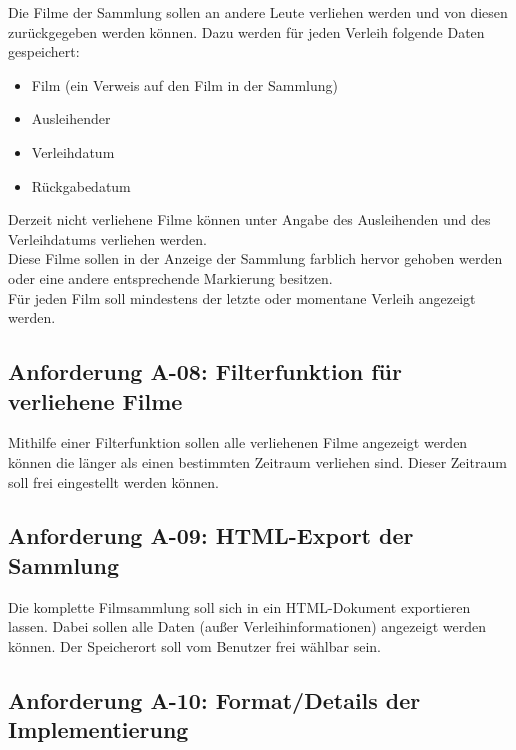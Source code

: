 \documentclass[oneside,german,oneside]{scrbook}
\begin{document}
        Die Filme der Sammlung sollen an andere Leute verliehen werden und von
        diesen zur\"uckgegeben werden k\"onnen. Dazu werden f\"ur jeden Verleih
        folgende Daten gespeichert:

        \begin{itemize}
          \item Film (ein Verweis auf den Film in der Sammlung)
          \item Ausleihender
          \item Verleihdatum
          \item R\"uckgabedatum
        \end{itemize}

        Derzeit nicht verliehene Filme k\"onnen unter Angabe des Ausleihenden und
        des Verleihdatums verliehen werden.\\
        Diese Filme sollen in der Anzeige der Sammlung farblich hervor gehoben
        werden oder eine andere entsprechende Markierung besitzen.\\
        F\"ur jeden Film soll mindestens der letzte oder momentane Verleih
        angezeigt werden.

    \subsection{Anforderung A-08: Filterfunktion f\"ur verliehene
    Filme}\label{anf:08}

        Mithilfe einer Filterfunktion sollen alle verliehenen Filme angezeigt
        werden k\"onnen die l\"anger als einen bestimmten Zeitraum verliehen sind.
        Dieser Zeitraum soll frei eingestellt werden k\"onnen.

    \subsection{Anforderung A-09: HTML-Export der Sammlung}\label{anf:09}

        Die komplette Filmsammlung soll sich in ein HTML-Dokument exportieren
        lassen. Dabei sollen alle Daten (au{\ss}er Verleihinformationen) angezeigt
        werden k\"onnen. Der Speicherort soll vom Benutzer frei w\"ahlbar sein.

    \subsection{Anforderung A-10: Format/Details der
    Implementierung}\label{anf:10}
\end{document}
